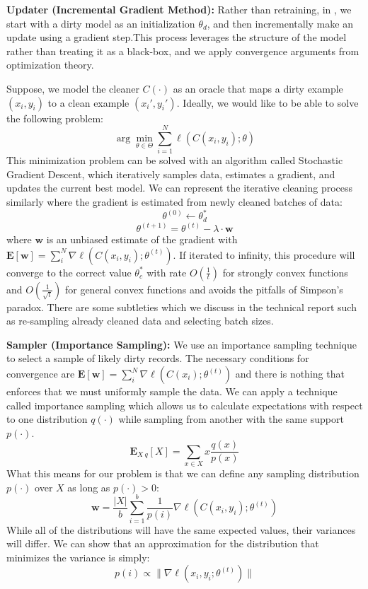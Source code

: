   \noindent\textbf{Updater (Incremental Gradient Method): } Rather than retraining, in \sys, we start with a dirty model as an initialization $\theta_d$, and then incrementally make an update using a gradient step.This process leverages the structure of the model rather than treating it as a black-box, and we apply convergence arguments from optimization theory.

Suppose, we model the cleaner $C(\cdot)$ as an oracle that maps a dirty example $(x_i,y_i)$ to a clean example $(x_i',y_i')$.
Ideally, we would like to be able to solve the following problem:
\[
\arg\min_{\theta \in \Theta} \sum_{i=1}^N \ell(C(x_i,y_i);\theta)
\]
This minimization problem can be solved with an algorithm called Stochastic Gradient Descent, which iteratively samples data, estimates a gradient, and updates the current best model.
We can represent the iterative cleaning process similarly where the gradient is estimated from newly cleaned batches of data:
\[
\theta^{(0)} \leftarrow \theta_d^{*}
\]
\[
\theta^{(t+1)} = \theta^{(t)} - \lambda \cdot \mathbf{w}
\]
where $\mathbf{w}$ is an unbiased estimate of the gradient with $\mathbf{E}[\mathbf{w}]=\sum_i^N\nabla \ell(C(x_i,y_i);\theta^{(t)})$.
If iterated to infinity, this procedure will converge to the correct value $\theta_c^*$ with rate $O(\frac{1}{t})$ for strongly convex functions and $O(\frac{1}{\sqrt{t}})$ for general convex functions and avoids the pitfalls of Simpson's paradox.
There are some subtleties which we discuss in the technical report such as re-sampling already cleaned data and selecting batch sizes. 

  \vspace{0.5em}

  \noindent\textbf{Sampler (Importance Sampling): } We use an importance sampling technique to select a sample of likely dirty records. The necessary conditions for convergence are $\mathbf{E}[\mathbf{w}]=\sum_i^N\nabla \ell(C(x_i);\theta^{(t)})$ and there is nothing that enforces that we must uniformly sample the data.
We can apply a technique called importance sampling which allows us to calculate expectations with respect to one distribution $q(\cdot)$ while sampling from another with the same support $p(\cdot)$. 
\[\mathbf{E}_{X~q}[X] = \sum_{x \in X} x \frac{q(x)}{p(x)} \]
What this means for our problem is that we can define any sampling distribution $p(\cdot)$ over $X$ as long as $p(\cdot) > 0$:
\[
\mathbf{w} = \frac{|X|}{b} \sum_{i=1}^{b} \frac{1}{p(i)} \nabla\ell(C(x_i,y_i);\theta^{(t)})
\]
While all of the distributions will have the same expected values, their variances will differ.
We can show that an approximation for the distribution that minimizes the variance is simply:
\[
p(i) \propto \|\nabla\ell(x_i,y_i;\theta^{(t)})\|
\]

